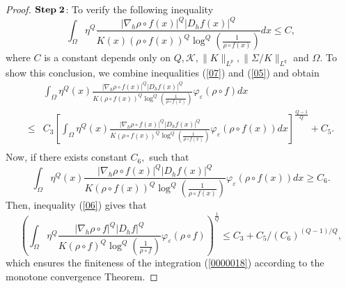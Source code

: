 \documentclass[11pt,twoside]{article}
\theoremstyle{definition}
\theoremstyle{remark}
\begin{document}
\begin{proof}
${\rm \mathbf{Step}\;\mathbf{2}}$:  To verify the following inequality
\begin{equation}\label{0000018}
\int_{\Omega}\eta^{Q}\frac{\vert\nabla_{h}\rho\circ f(x)\vert^{Q}\vert D_{h}f(x)\vert^{Q}}{K(x)(\rho\circ f(x))^{Q}\log^{Q}(\frac{1}{\rho\circ f(x)})}dx\leq C,
\end{equation}
where $C$ is a constant depends only on $Q,\mathcal{K},\|K\|_{L^{p}},\|\Sigma/K\|_{L^{q}}$ and $\Omega.$ To show this conclusion, we combine inequalities (\ref{07}) and (\ref{05}) and obtain
\begin{equation}\label{06}
\begin{aligned}
&\int_{\Omega}\eta^{Q}(x)\frac{\vert\nabla_{h}\rho\circ f(x)\vert^{Q}\vert D_{h}f(x)\vert^{Q}}{K(\rho\circ f(x))^{Q}\log^{Q}(\frac{1}{\rho\circ f(x)})}\varphi_{\varepsilon}(\rho\circ f)dx\\
\leq& C_{3} \left[\int_{\Omega}\eta^{Q}(x)\frac{\vert\nabla_{h}\rho\circ f(x)\vert^{Q}\vert D_{h}f(x)\vert^{Q}}{K(\rho\circ f(x))^{Q}\log^{Q}(\frac{1}{\rho\circ f(x)})}\varphi_{\varepsilon}(\rho\circ f(x))dx\right]^{\frac{Q-1}{Q}}+C_{5}.\\
\end{aligned}
\end{equation}
Now, if there exists constant $C_{6},$ such that
$$\int_{\Omega}\eta^{Q}(x)\frac{\vert\nabla_{h}\rho\circ f(x)\vert^{Q}\vert D_{h}f(x)\vert^{Q}}{K(\rho\circ f(x))^{Q}\log^{Q}(\frac{1}{\rho\circ f(x)})}\varphi_{\varepsilon}(\rho\circ f(x))dx\geq C_{6}.$$
Then, inequality (\ref{06}) gives that 
$$
\left(\int_{\Omega}\eta^{Q}\frac{\vert\nabla_{h}\rho\circ f\vert^{Q}\vert D_{h}f\vert^{Q}}{K(\rho\circ f)^{Q}\log^{Q}(\frac{1}{\rho\circ f})}\varphi_{\varepsilon}(\rho\circ f)\right)^{\frac{1}{Q}}\leq
C_{3}+C_{5}/(C_{6})^{(Q-1)/Q},
$$
which ensures the  finiteness of the integration (\ref{0000018}) according to the monotone convergence Theorem.


\end{proof}
\end{document}
